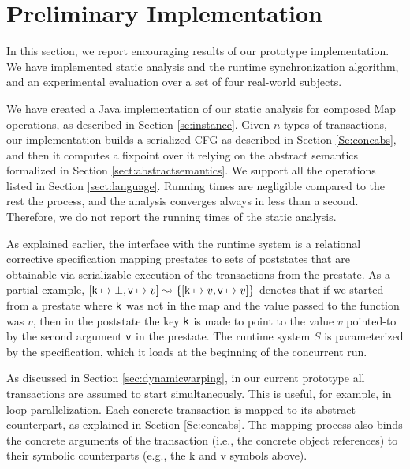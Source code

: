 \section{Preliminary Implementation}\label{Se:experiments}

In this section, we report encouraging results of our prototype implementation.
We have implemented static analysis and the runtime synchronization algorithm, and an experimental evaluation over a set of four real-world subjects. 

We have created a Java implementation of our static analysis for composed {\sf Map} operations, as described  in Section \ref{se:instance}. Given $n$ types of transactions, our implementation builds a serialized CFG as described in Section \ref{Se:concabs}, and then it computes a fixpoint over it relying on the abstract semantics formalized in Section \ref{sect:abstractsemantics}. We support all the operations listed in Section \ref{sect:language}. Running times are negligible compared to the rest the process, and the analysis converges always in less than a second. Therefore, we do not report the running times of the static analysis.

As explained earlier, the interface with the runtime system is a relational corrective specification mapping prestates to sets of poststates that are obtainable via serializable execution of the transactions from the prestate. As a partial example, 
$[ {\sf k} \mapsto \bot , {\sf v} \mapsto v ] \leadsto \{ [ {\sf k} \mapsto v , {\sf v} \mapsto v ] \}$
denotes that if we started from a prestate where ${\sf k}$ was not in the map and the value passed to the function was $v$, then in the poststate the key ${\sf k}$ is made to point to the value $v$ pointed-to by the second argument ${\sf v}$ in the prestate.
%
The runtime system $S$ is parameterized by the specification, which it loads at the beginning of the concurrent run. 

As discussed in Section \ref{sec:dynamicwarping}, in our current prototype all transactions are assumed to start simultaneously. This is useful, for example, in loop parallelization. Each concrete transaction is mapped to its abstract counterpart, as explained in Section \ref{Se:concabs}. The mapping process also binds the concrete arguments of the transaction (i.e., the concrete object references) to their symbolic counterparts (e.g., the {\sf k} and {\sf v} symbols above). 

